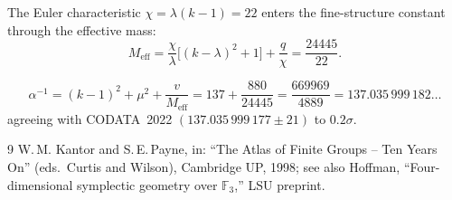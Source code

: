 The Euler characteristic $\chi = \lambda(k{-}1) = 22$ enters the
fine-structure constant through the effective mass:
\begin{equation}
M_{\mathrm{eff}} = \frac{\chi}{\lambda}\bigl[(k{-}\lambda)^2+1\bigr]
+ \frac{q}{\chi} = \frac{24445}{22}.
\end{equation}

\begin{theorem}
\begin{equation}
\boxed{
\alpha^{-1} = (k{-}1)^2 + \mu^2 + \frac{v}{M_{\mathrm{eff}}}
= 137 + \frac{880}{24445} = \frac{669969}{4889} = 137.035\,999\,182\ldots}
\end{equation}
agreeing with CODATA~2022 $(137.035\,999\,177\pm 21)$ to $0.2\sigma$.
\end{theorem}

\begin{thebibliography}{9}
 W.\,M. Kantor and S.\,E.\,Payne,
  in: ``The Atlas of Finite Groups -- Ten Years On'' (eds.\ Curtis and Wilson),
  Cambridge UP, 1998; see also Hoffman,
  ``Four-dimensional symplectic geometry over $\mathbb{F}_3$,'' LSU preprint.
\end{thebibliography}
